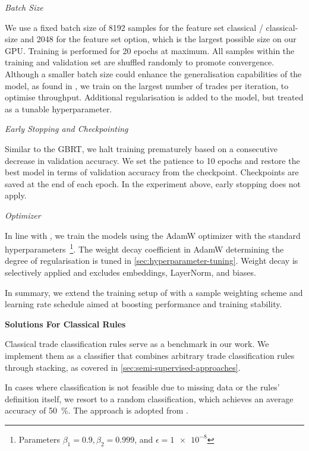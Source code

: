 \emph{Batch Size}

We use a fixed batch size of \num{8192} samples for the feature set classical / classical-size and \num{2048} for the feature set option, which is the largest possible size on our \gls{GPU}. Training is performed for \num{20} epochs at maximum. All samples within the training and validation set are shuffled randomly to promote convergence. Although a smaller batch size could enhance the generalisation capabilities of the model, as found in \textcite[][3]{keskarLargeBatchTrainingDeep2017}, we train on the largest number of trades per iteration, to optimise throughput. Additional regularisation is added to the model, but treated as a tunable hyperparameter.

\emph{Early Stopping and Checkpointing}

Similar to the \gls{GBRT}, we halt training prematurely based on a consecutive decrease in validation accuracy. We set the patience to \num{10} epochs and restore the best model in terms of validation accuracy from the checkpoint. Checkpoints are saved at the end of each epoch. In the experiment above, early stopping does not apply.

\emph{Optimizer}

In line with \textcite[][6]{gorishniyRevisitingDeepLearning2021}, we train the models using the AdamW optimizer \autocite[][2--3]{loshchilovDecoupledWeightDecay2019} with the standard hyperparameters~\footnote{Parameters $\beta_{1}=0.9, \beta_{2}=0.999$, and $\epsilon = \num{1e-8}$}. The weight decay coefficient in AdamW determining the degree of regularisation is tuned in \cref{sec:hyperparameter-tuning}. Weight decay is selectively applied and excludes embeddings, LayerNorm, and biases.

In summary, we extend the training setup of \textcite[][6]{gorishniyRevisitingDeepLearning2021} with a sample weighting scheme and learning rate schedule aimed at boosting performance and training stability.

\textbf{Solutions For Classical Rules}

Classical trade classification rules serve as a benchmark in our work. We implement them as a classifier that combines arbitrary trade classification rules through stacking, as covered in \cref{sec:semi-supervised-approaches}.

In cases where classification is not feasible due to missing data or the rules' definition itself, we resort to a random classification, which achieves an average accuracy of \SI{50}{\percent}. The approach is adopted from \textcite[][887]{savickasInferringDirectionOption2003}. 

